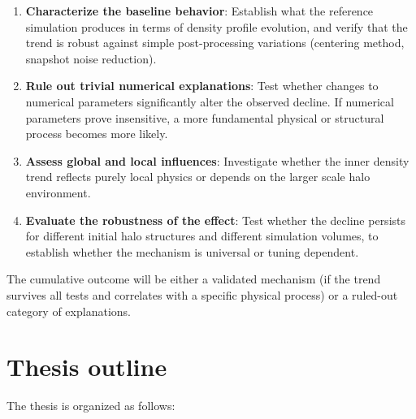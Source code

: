 \begin{enumerate}

\item \textbf{Characterize the baseline behavior}: Establish what the reference simulation produces in terms of density profile evolution, and verify that the trend is robust against simple post-processing variations (centering method, snapshot noise reduction).

\item \textbf{Rule out trivial numerical explanations}: Test whether changes to numerical parameters significantly alter the observed decline. If numerical parameters prove insensitive, a more fundamental physical or structural process becomes more likely.

\item \textbf{Assess global and local influences}: Investigate whether the inner density trend reflects purely local physics or depends on the larger scale halo environment.

\item \textbf{Evaluate the robustness of the effect}: Test whether the decline persists for different initial halo structures and different simulation volumes, to establish whether the mechanism is universal or tuning dependent.

\end{enumerate}

The cumulative outcome will be either a validated mechanism (if the trend survives all tests and correlates with a specific physical process) or a ruled-out category of explanations.

\section{Thesis outline}

The thesis is organized as follows:

